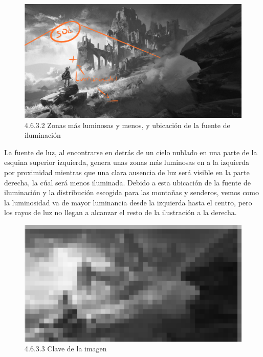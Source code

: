 \documentclass[12pt]{article}
\begin{document}
    \begin{figure}[H]
      \centering
      \includegraphics[scale=0.4]{images/Nerea/Nerea Zelda concept 632.PNG}
      \caption{\small 4.6.3.2 Zonas más luminosas y menos, y ubicación de la fuente de iluminación}
    \end{figure}

    La fuente de luz, al encontrarse en detrás de un cielo nublado en una parte de la esquina superior izquierda, genera unas zonas más luminosas en a la izquierda por proximidad mientras que una clara ausencia de luz será visible en la parte derecha, la cúal será menos iluminada. Debido a esta ubicación de la fuente de iluminación y la distribución escogida para las montañas y senderos, vemos como la luminosidad va de mayor luminancia desde la izquierda hasta el centro, pero los rayos de luz no llegan a alcanzar el resto de la ilustración a la derecha.

    \begin{figure}[H]
      \centering
      \includegraphics[scale=0.4]{images/Nerea/Nerea Zelda concept 633.PNG}
      \caption{\small 4.6.3.3 Clave de la imagen}
    \end{figure}
\end{document}
